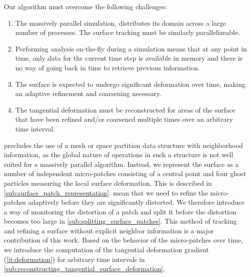 %
Our algorithm must overcome the following challenges:
%
\begin{enumerate}
    \item \label{it:parallel}
        The massively parallel simulation, distributes its domain across a large
        number of processes. The surface tracking must be similarly
        parallelizeable.
    \item \label{it:on-the-fly}
        Performing analysis on-the-fly during a simulation means that at any
        point in time, only data for the current time step is available in
        memory and there is no way of going back in time to retrieve previous
        information.
    \item \label{it:refinement}
        The surface is expected to undergo significant deformation over time,
        making an adaptive refinement and coarsening necessary.
    \item \label{it:deformation}
        The tangential deformation must be reconstructed for areas of the
        surface that have been refined and/or coarsened multiple times over an
        arbitrary time interval.
\end{enumerate}
%
 precludes the use of a mesh or space partition data
structure with neighborhood information, as the global nature of operations in
such a structure is not well suited for a massively parallel algorithm.
%
Instead, we represent the surface as a number of independent micro-patches
consisting of a central point and four ghost particles measuring the local
surface deformation.
%
This is described in \cref{sub:surface_patch_representation}.
%
 mean that we need to refine
the micro-patches adaptively before they are significantly distorted.
%
We therefore introduce a way of monitoring the distortion of a patch and split
it before the distortion becomes too large in
\cref{sub:splitting_surface_patches}.
%
This method of tracking and refining a surface without explicit neighbor
information is a major contribution of this work.
%
Based on the behavior of the micro-patches over time, we introduce the
computation of the tangential deformation gradient (\cref{it:deformation})
for arbitrary time intervals in
\cref{sub:reconstructing_tangential_surface_deformation}.
%

